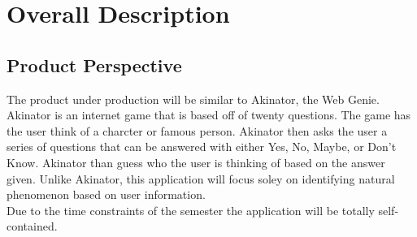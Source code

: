 \documentclass[]{article}
\begin{document}


\section{Overall Description}
\label{sec:overall_description}


\subsection{Product Perspective}
\label{sub:product_perspective}
The product under production will be similar to Akinator, the Web Genie. Akinator is an internet game that is based off of twenty questions. The game has the user think of a charcter or famous person. Akinator then asks the user a series of questions that can be answered with either Yes, No, Maybe, or Don't Know. Akinator than guess who the user is thinking of based on the answer given.  Unlike Akinator, this application will focus soley on identifying natural phenomenon based on user information.\\
Due to the time constraints of the semester the application will be totally self-contained. 
\end{document}
